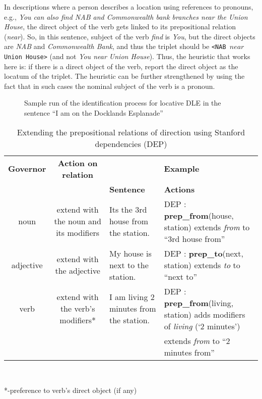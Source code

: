\documentclass[letter]{sig-alternate}
\begin{document}
In descriptions where a person describes a location using references to pronouns, e.g., \textit{You can also find NAB and Commonwealth bank branches near the Union House}, the direct object of the verb gets linked to its prepositional relation (\textit{near}). So, in this sentence, subject of the verb \textit{find} is \textit{You}, but the direct objects are \textit{NAB} and \textit{Commonwealth Bank}, and thus the triplet should be \texttt{<NAB $near$ Union House>} (and not \textit{You near Union House}). Thus, the heuristic that works here is: if there is a direct object of the verb, report the direct object as the locatum of the triplet. The heuristic can be further strengthened by using the fact that in such cases the nominal subject of the verb is a pronoun.
\begin{figure}
\centering
\caption{Sample run of the identification process for locative DLE in the sentence  ``I am on the Docklands Esplanade''}
\label{fig:phase1}
\end{figure}
\begin{table*}
\centering
\caption{Extending the prepositional relations of direction using Stanford dependencies (DEP)}
\begin{tabular}{|c|c|p{3.8cm}|p{4.7cm}|} \hline
\textbf{Governor}&\textbf{Action on relation}&\multicolumn{2}{|c|}{\textbf{Example}} \\ \cline{3-4}
&&\textbf{Sentence}&\textbf{Actions}\\ \hline
noun & extend with the noun and its modifiers&Its the 3rd house from the station.&DEP : \textbf{prep\_from}(house, station)
extends \textit{from} to ``3rd house from'' \\ \hline
adjective & extend with the adjective&My house is next to the station.&DEP : {\textbf{prep\_to}}(next, station)
extends \textit{to} to ``next to''\\ \hline
verb & extend with the verb's modifiers*&I am living 2 minutes from the station.&DEP : \textbf{prep\_from}(living, station)
adds modifiers of \textit{living} (`2 minutes')
\\&&& 
extends \textit{from} to ``2 minutes from''\\
\hline\end{tabular}
\\ \begin{flushleft}
*-preference to verb's direct object (if any)
\end{flushleft}
\label{table:partial}
\end{table*}
\end{document}
